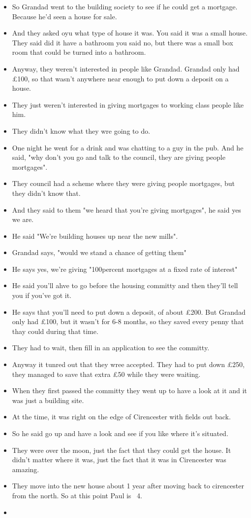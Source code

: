 \documentclass[10pt,twocolumn,letterpaper]{article}
\begin{document}
\begin{itemize}
    \item So Grandad went to the building society to see if he could get a mortgage. Because he'd seen a house for sale.
    \item And they asked oyu what type of house it was. You said it was a small house. They said did it have a bathroom you said no, but there was a small box room that could be turned into a bathroom. 
    \item Anyway, they weren't interested in people like Grandad. Grandad only had £100, so that wasn't anywhere near enough to put down a deposit on a house.
    \item They just weren't interested in giving mortgages to working class people like him.
    \item They didn't know what they wre going to do.
    \item One night he went for a drink and was chatting to a guy in the pub. And he said, "why don't you go and talk to the council, they are giving people mortgages".
    \item They council had a scheme where they were giving people mortgages, but they didn't know that.
    \item And they said to them "we heard that you're giving mortgages", he said yes we are.
    \item He said "We're building houses up near the new mills".
    \item Grandad says, "would we stand a chance of getting them"
    \item He says yes, we're giving "100percent mortgages at a fixed rate of interest"
    \item He said you'll ahve to go before the housing committy and then they'll tell you if you've got it.
    \item He says that you'll need to put down a deposit, of about £200. But Grandad only had £100, but it wasn't for 6-8 months, so they saved every penny that thay could during that time. 
    \item They had to wait, then fill in an application to see the committy.
    \item Anyway it tunred out that they wree accepted. They had to put down £250, they managed to save that extra £50 while they were waiting.
    \item When they first passed the committy they went up to have a look at it and it was just a building site.
    \item At the time, it was right on the edge of Cirencester with fields out back.
    \item So he said go up and have a look and see if you like where it's situated.
    \item They were over the moon, just the fact that they could get the house. It didn't matter where it was, just the fact that it was in Cirencester was amazing.
    \item They move into the new house about 1 year after moving back to cirencester from the north. So at this point Paul is ~4.
    \item 
\end{itemize}
\end{document}
